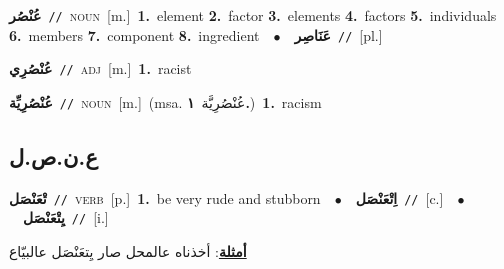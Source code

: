 \documentclass[10pt,a4paper,twoside]{article} %
\begin{document}
\begin{multicols}{2}
{\setlength\topsep{0pt}\textbf{\foreignlanguage{arabic}{عُنْصُر}}\ {\color{gray}\texttt{//}\color{black}}\ \textsc{noun}\ [m.]\ \textbf{1.}~element  \textbf{2.}~factor  \textbf{3.}~elements  \textbf{4.}~factors  \textbf{5.}~individuals  \textbf{6.}~members  \textbf{7.}~component  \textbf{8.}~ingredient\ \ $\bullet$\ \ \setlength\topsep{0pt}\textbf{\foreignlanguage{arabic}{عَنَاصِر}}\ {\color{gray}\texttt{//}\color{black}}\ [pl.]\ } \vspace{2mm}

{\setlength\topsep{0pt}\textbf{\foreignlanguage{arabic}{عُنْصُرِي}}\ {\color{gray}\texttt{//}\color{black}}\ \textsc{adj}\ [m.]\ \textbf{1.}~racist\ } \vspace{2mm}

{\setlength\topsep{0pt}\textbf{\foreignlanguage{arabic}{عُنْصُرِيِّة}}\ {\color{gray}\texttt{//}\color{black}}\ \textsc{noun}\ [m.]\ \color{gray}(msa. \foreignlanguage{arabic}{عُنْصُرِيَّة}~\foreignlanguage{arabic}{\textbf{١.}})\color{black}\ \textbf{1.}~racism\ } \vspace{2mm}

\vspace{-3mm}
\subsection*{\color{blue}\foreignlanguage{arabic}{ع.ن.ص.ل}\color{blue}{}} 

{\setlength\topsep{0pt}\textbf{\foreignlanguage{arabic}{تْعَنْصَل}}\ {\color{gray}\texttt{//}\color{black}}\ \textsc{verb}\ [p.]\ \textbf{1.}~be very rude and stubborn\ \ $\bullet$\ \ \setlength\topsep{0pt}\textbf{\foreignlanguage{arabic}{اِتْعَنْصَل}}\ {\color{gray}\texttt{//}\color{black}}\ [c.]\ \ $\bullet$\ \ \setlength\topsep{0pt}\textbf{\foreignlanguage{arabic}{يِتْعَنْصَل}}\ {\color{gray}\texttt{//}\color{black}}\ [i.]\  \begin{flushright}\color{gray}\foreignlanguage{arabic}{\textbf{\underline{\foreignlanguage{arabic}{أمثلة}}}: أخذناه عالمحل صار يِتعَنْصَل عالبيّاع}\end{flushright}\color{black}} \vspace{2mm}


\end{multicols}
\end{document}
